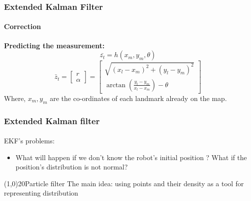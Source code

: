 \documentclass{beamer}
\begin{document}
	\begin{frame}
		\frametitle{Extended Kalman Filter}
		\framesubtitle{Correction}
		\textbf{Predicting the measurement:}
		\begin{equation*}
			\bar{z_{t}}=h(x_m,y_m,\theta)
		\end{equation*}
		\begin{equation*}
			\bar{z}_t=\begin{bmatrix}
				r\\\alpha
			\end{bmatrix}
			=
			\begin{bmatrix}
				\sqrt{(x_l-x_m)^2+(y_l-y_m)^2}\\
				\arctan\left(\frac{y_l-y_m}{x_l-x_m}\right)-\theta
			\end{bmatrix}
		\end{equation*}
		Where, $ x_m,y_m $ are the co-ordinates of each landmark already on the map. 
	\end{frame}





	\begin{frame}
		\frametitle{Extended Kalman filter}
		
		\framesubtitle{}
		EKF's problems:
		\begin{itemize}
			\item What will happen if we don’t know the robot's initial position ? What if the position’s distribution is not normal?
		\end{itemize}
		\thicklines \vector(1,0){20}Particle filter
The main idea: using points and their density as a tool for representing distribution
	\end{frame}
\end{document}
